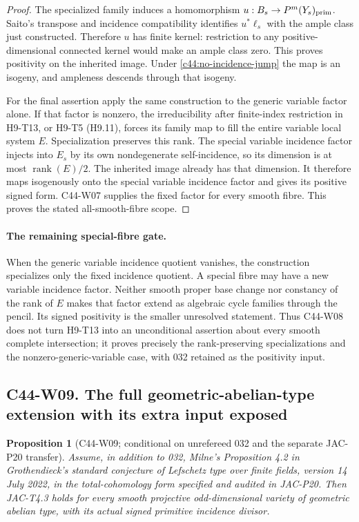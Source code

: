 \documentclass[11pt]{article}
\newtheorem{proposition}[theorem]{Proposition}
\theoremstyle{remark}\newtheorem{remark}[theorem]{Remark}
\begin{document}
\begin{proof}
The specialized family induces a homomorphism
$u:B_s\to P^m(Y_s)_{\rm prim}$. Saito's transpose and incidence
compatibility identifies $u^*\ell_s$ with the ample class just
constructed. Therefore $u$ has finite kernel: restriction to any
positive-dimensional connected kernel would make an ample class
zero. This proves positivity on the inherited image. Under
\eqref{c44:no-incidence-jump} the map is an isogeny, and ampleness
descends through that isogeny.

For the final assertion apply the same construction to the generic
variable factor alone. If that factor is nonzero, the irreducibility
after finite-index restriction in H9-T13, or H9-T5 (H9.11), forces
its family map to fill the entire variable local system $E$.
Specialization preserves this rank. The special variable incidence
factor injects into $E_s$ by its own nondegenerate self-incidence,
so its dimension is at most $\operatorname{rank}(E)/2$. The
inherited image already has that dimension. It therefore maps
isogenously onto the special variable incidence factor and gives
its positive signed form. C44-W07 supplies the fixed factor for
every smooth fibre. This proves the stated all-smooth-fibre scope.
\end{proof}

\paragraph{The remaining special-fibre gate.}
When the generic variable incidence quotient vanishes, the
construction specializes only the fixed incidence quotient. A
special fibre may have a new variable incidence factor. Neither
smooth proper base change nor constancy of the rank of $E$ makes
that factor extend as algebraic cycle families through the pencil.
Its signed positivity is the smaller unresolved statement. Thus
C44-W08 does not turn H9-T13 into an unconditional assertion about
every smooth complete intersection; it proves precisely the
rank-preserving specializations and the nonzero-generic-variable
case, with 032 retained as the positivity input.

\subsection*{C44-W09. The full geometric-abelian-type extension with its extra input exposed}

\begin{proposition}[C44-W09; conditional on unrefereed 032 and the separate JAC-P20 transfer]
Assume, in addition to 032, Milne's Proposition 4.2 in
\emph{Grothendieck's standard conjecture of Lefschetz type over
finite fields}, version 14 July 2022, in the total-cohomology form
specified and audited in JAC-P20. Then JAC-T4.3 holds for every
smooth projective odd-dimensional variety of geometric abelian
type, with its actual signed primitive incidence divisor.
\end{proposition}
\end{document}
